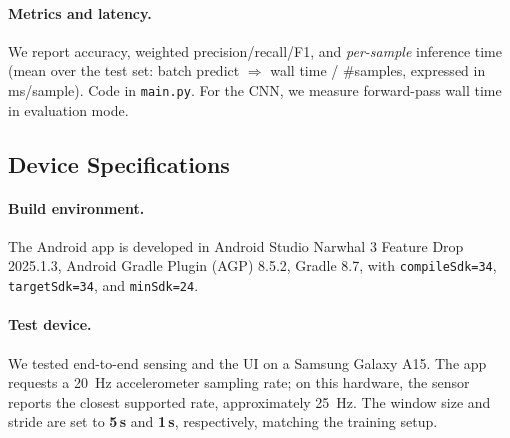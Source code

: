 \documentclass[10pt,twocolumn]{article}
\begin{document}
\paragraph{Metrics and latency.} We report accuracy, weighted precision/recall/F1, and \emph{per-sample} inference time (mean over the test set: batch predict \(\Rightarrow\) wall time / \#samples, expressed in ms/sample). Code in \texttt{main.py}. For the CNN, we measure forward-pass wall time in evaluation mode.

\subsection{Device Specifications}
\label{sec:device-specs}
\paragraph{Build environment.}
The Android app is developed in Android Studio Narwhal 3 Feature Drop 2025.1.3, Android Gradle Plugin (AGP) 8.5.2, Gradle 8.7, with \texttt{compileSdk=34}, \texttt{targetSdk=34}, and \texttt{minSdk=24}.

\paragraph{Test device.}
We tested end-to-end sensing and the UI on a Samsung Galaxy A15. The app requests a \SI{20}{Hz} accelerometer sampling rate; on this hardware, the sensor reports the closest supported rate, approximately \SI{25}{Hz}. The window size and stride are set to \textbf{5\,s} and \textbf{1\,s}, respectively, matching the training setup.
\end{document}
